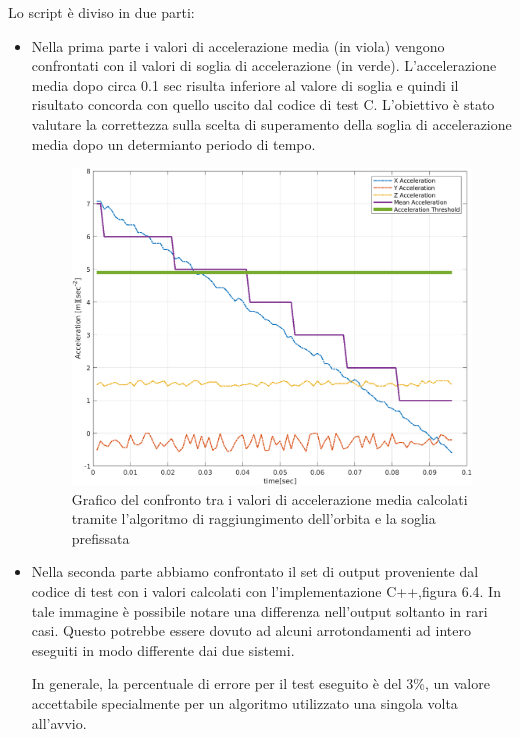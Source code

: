 \documentclass[LaM,binding=0.6cm]{../sapthesis}
\begin{document}
Lo script è diviso in due parti:
\begin{itemize} 
\item Nella prima parte i valori di accelerazione media (in viola) vengono confrontati con il valori di soglia di accelerazione (in verde). L'accelerazione media dopo circa 0.1 sec risulta inferiore al valore di soglia e quindi il risultato concorda con quello uscito dal codice di test C. L'obiettivo è stato valutare la correttezza sulla scelta di superamento della soglia di accelerazione media dopo un determianto periodo di tempo.
    
    \begin{figure}[htbp]
    \centerline{\includegraphics[scale=0.6]{examples/MeanAcceleration.png}}
    \caption{Grafico del confronto tra i valori di accelerazione media calcolati tramite l'algoritmo di raggiungimento dell'orbita e la soglia prefissata}
    \label{fig}
    \end{figure}
\newpage
    \item Nella seconda parte abbiamo confrontato il set di output proveniente dal codice di test con i valori calcolati con l'implementazione C++,figura 6.4. In tale immagine è possibile notare una differenza nell'output soltanto in rari casi. Questo potrebbe essere dovuto ad alcuni arrotondamenti ad intero eseguiti in modo differente dai due sistemi.

    In generale, la percentuale di errore per il test eseguito è del 3\%, un valore accettabile specialmente per un algoritmo utilizzato una singola volta all'avvio.
    

\end{itemize}
\end{document}
